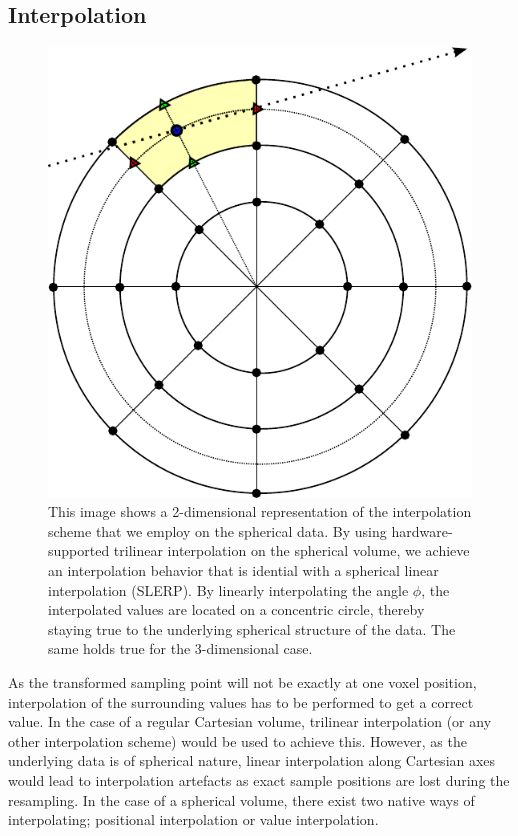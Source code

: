 \documentclass{egpubl}
\begin{document}
\subsection{Interpolation}
\label{sec:interpolation}
\begin{figure}
	\centering
	\includegraphics[width=\columnwidth]{figures/spherical_interpolation.pdf}
	\caption{This image shows a 2-dimensional representation of the interpolation scheme that we employ on the spherical data. By using hardware-supported trilinear interpolation on the spherical volume, we achieve an interpolation behavior that is idential with a spherical linear interpolation (SLERP). By linearly interpolating the angle $\phi$, the interpolated values are located on a concentric circle, thereby staying true to the underlying spherical structure of the data. The same holds true for the 3-dimensional case.}
	\label{fig:interpolation}
\end{figure}

As the transformed sampling point will not be exactly at one voxel position, interpolation of the surrounding values has to be performed to get a correct value. In the case of a regular Cartesian volume, trilinear interpolation (or any other interpolation scheme) would be used to achieve this. However, as the underlying data is of spherical nature, linear interpolation along Cartesian axes would lead to interpolation artefacts as exact sample positions are lost during the resampling. In the case of a spherical volume, there exist two native ways of interpolating; positional interpolation or value interpolation.
\end{document}
